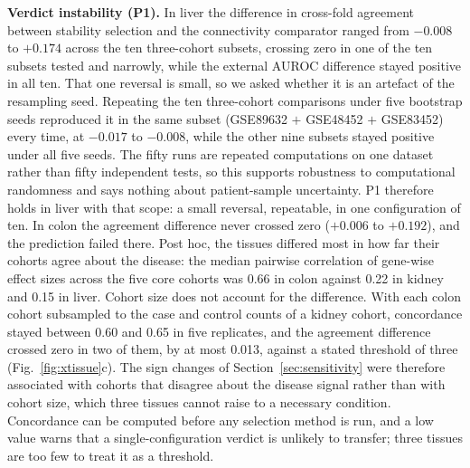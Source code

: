 \documentclass[pdflatex,sn-vancouver-num]{sn-jnl}
\theoremstyle{thmstyleone}
\theoremstyle{thmstyletwo}
\theoremstyle{thmstylethree}
\begin{document}
\textbf{Verdict instability (P1).} In liver the difference in cross-fold agreement between
stability selection and the connectivity comparator ranged from $-0.008$ to $+0.174$ across the ten
three-cohort subsets, crossing zero in one of the ten subsets tested and narrowly, while the
external AUROC difference stayed positive in all ten. That one reversal is small, so we asked
whether it is an artefact of the resampling seed. Repeating the ten three-cohort comparisons under
five bootstrap seeds reproduced it in the same subset (GSE89632 $+$ GSE48452 $+$ GSE83452) every
time, at $-0.017$ to $-0.008$, while the other nine subsets stayed positive under all five seeds.
The fifty runs are repeated computations on one dataset rather than fifty independent tests, so
this supports robustness to computational randomness and says nothing about patient-sample
uncertainty. P1 therefore holds in liver with that scope: a small reversal, repeatable, in one
configuration of ten. In colon the agreement difference never crossed zero ($+0.006$ to
$+0.192$), and the prediction failed there. Post hoc, the tissues differed most in how far their
cohorts agree about the disease: the median pairwise correlation of gene-wise effect sizes
across the five core cohorts was 0.66 in colon against 0.22 in kidney and 0.15 in liver. Cohort
size does not account for the difference. With each colon cohort subsampled to the case and
control counts of a kidney cohort, concordance stayed between 0.60 and 0.65 in five replicates,
and the agreement difference crossed zero in two of them, by at most 0.013, against a stated
threshold of three (Fig.~\ref{fig:xtissue}c). The sign changes of
Section~\ref{sec:sensitivity} were therefore associated with cohorts that disagree about the
disease signal rather than with cohort size, which three tissues cannot raise to a necessary
condition.
Concordance can be computed before any selection method is run, and a low value warns that a
single-configuration verdict is unlikely to transfer; three tissues are too few to treat it as a
threshold.
\end{document}
